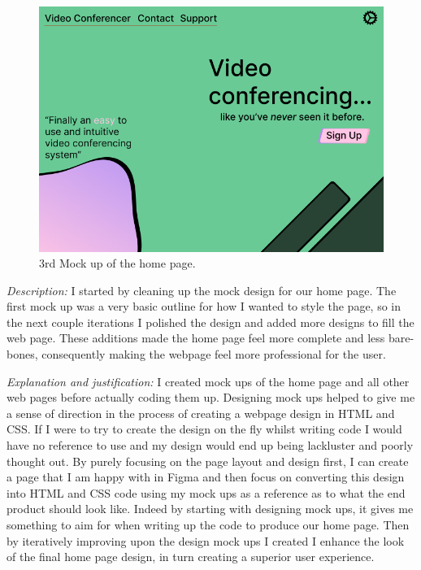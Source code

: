 \begin{figure}[H]
\centering

\includegraphics[scale=0.2]{Images/HomeUI_3.png}

\caption{3rd Mock up of the home page.}
\label{fig:ui3}
\end{figure}

\textit{Description:}
I started by cleaning up the mock design for our home page.
The first mock up was a very basic outline for how I wanted to 
style the page, so in the next couple iterations I polished 
the design and added more designs to fill the web page. These
additions made the home page feel more complete and less 
bare-bones, consequently making the webpage feel more 
professional for the user. \\ \vspace{0.2cm}

\textit{Explanation and justification:}
I created mock ups of the home page and all other web pages 
before actually coding them up. Designing mock ups helped 
to give me a sense of direction in the process of creating a 
webpage design in HTML and CSS. If I were to try to create 
the design on the fly whilst writing code I would have no
reference to use and my design would end up being lackluster 
and poorly thought out. By purely focusing on the page layout 
and design first, I can create a page that I am happy with in 
Figma and then focus on converting this design into HTML and 
CSS code using my mock ups as a reference as to what the end 
product should look like. Indeed by starting with designing 
mock ups, it gives me something to aim for when writing up 
the code to produce our home page. Then by iteratively
improving upon the design mock ups I created I enhance
the look of the final home page design, in turn creating
a superior user experience.
\\ \vspace{0.2cm}

